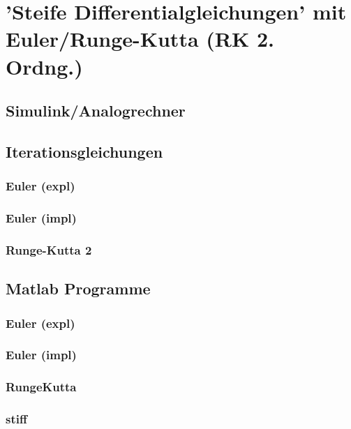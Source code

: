 \documentclass[10pt]{scrartcl}
\author{Andre Harms, Oliver Steenbuck}
\title{\titletext}
\date{02.11.2011}
\begin{document}
\maketitle

\setcounter{tocdepth}{3}
\tableofcontents

\section{'Steife Differentialgleichungen' mit Euler/Runge-Kutta (RK 2. Ordng.)}
	\subsection{Simulink/Analogrechner}
	
	\subsection{Iterationsgleichungen}
		\subsubsection{Euler (expl)}
		
		\subsubsection{Euler (impl)}
		
		\subsubsection{Runge-Kutta 2}
		
	\subsection{Matlab Programme}
		\subsubsection{Euler (expl)}
		
		\subsubsection{Euler (impl)}
		
		\subsubsection{Runge\-Kutta}
		
		\subsubsection{stiff}		
		
\end{document}
